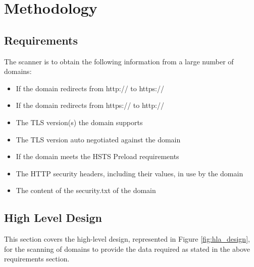 \documentclass{mscreport}
\begin{document}
\clearpage
\newpage

\section{Methodology}
\label{section:methodology}

\subsection{Requirements}

The scanner is to obtain the following information from a large number of domains:

\begin{itemize}
	\setlength\itemsep{0.1em}
    \item If the domain redirects from http:// to https://
    \item If the domain redirects from https:// to http://
    \item The TLS version(s) the domain supports
    \item The TLS version auto negotiated against the domain
    \item If the domain meets the HSTS Preload requirements
    \item The HTTP security headers, including their values, in use by the domain
    \item The content of the security.txt of the domain
\end{itemize}

\subsection{High Level Design}
\label{subsection:hld}

This section covers the high-level design, represented in Figure \ref{fig:hla_design}, for the scanning of domains to provide the data required as stated in the above requirements section. 

\end{document}

